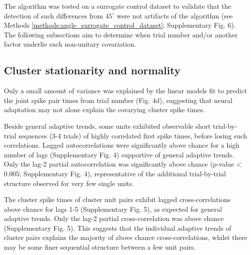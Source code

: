 \documentclass{article}
\begin{document}
The algorithm was tested on a surrogate control dataset to validate that the detection of such differences from $45^{\circ}$ were not artifacts of the algorithm (see Methods \ref{methods:angle_surrogate_control_dataset}; Supplementary Fig. 6). The following subsections aim to determine when trial number and/or another factor underlie such non-unitary covariation.



\subsection*{Cluster stationarity and normality}

Only a small amount of variance was explained by the linear models fit to predict the joint spike pair times from trial number (Fig. 4d), suggesting that neural adaptation may not alone explain the covarying cluster spike times. 

Beside general adaptive trends, some units exhibited observable short trial-by-trial sequences (3-4 trials) of highly correlated first spike times, before losing such correlations. Lagged autocorrelations were significantly above chance for a high number of lags (Supplementary Fig. 4) supportive of general adaptive trends. Only the lag-2 partial autocorrelation was significantly above chance (p-value < 0.005; Supplementary Fig. 4), representative of the additional trial-by-trial structure observed for very few single units.

The cluster spike times of cluster unit pairs exhibit lagged cross-correlations above chance for lags 1-5 (Supplementary Fig. 5), as expected for general adaptive trends. Only the lag-2 partial cross-correlation was above chance (Supplementary Fig. 5). This suggests that the individual adaptive trends of cluster pairs explains the majority of above chance cross-correlations, whilst there may be some finer sequential structure between a few unit pairs. 

\end{document}
